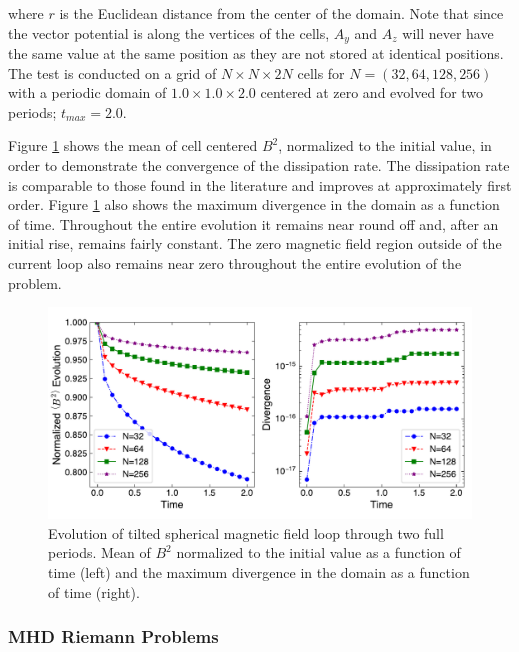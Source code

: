 \documentclass[modern, linenumbers]{aastex631}
\newcommand*{\img}[1]{%
    \raisebox{-.3\baselineskip}{%
        \texttt{[image: \#1]}%
    }%
}
\begin{document}
\noindent where $r$ is the Euclidean distance from the center of the domain. Note that since the vector potential is along the vertices of the cells, $A_y$ and $A_z$ will never have the same value at the same position as they are not stored at identical positions. The test is conducted on a grid of $N\times N\times 2N$ cells for $N=(32, 64, 128, 256)$ with a periodic domain of $1.0\times1.0\times2.0$ centered at zero and evolved for two periods; $t_{max} = 2.0$.

Figure \ref{fig:afl} shows the mean of cell centered $B^2$, normalized to the initial value, in order to demonstrate the convergence of the dissipation rate. The dissipation rate is comparable to those found in the literature \citep{stone_athena_2008} and improves at approximately first order. Figure \ref{fig:afl} also shows the maximum divergence in the domain as a function of time. Throughout the entire evolution it remains near round off and, after an initial rise, remains fairly constant. The zero magnetic field region outside of the current loop also remains near zero throughout the entire evolution of the problem.

\begin{figure}[ht!]
    \includegraphics[width=\linewidth]{afl.pdf}
    \caption{Evolution of tilted spherical magnetic field loop through two full periods. Mean of $B^2$ normalized to the initial value as a function of time (left) and the maximum divergence in the domain as a function of time (right). \href{https://github.com/bcaddy/caddy-et-al-2023/blob/a5d284c28192e6ae8b0c09e82f75a36456cf0ca6/python/advecting-field-loop.py}{\img{github.png}}}
    \label{fig:afl}
\end{figure}

\subsubsection{MHD Riemann Problems}
\label{sec:riemann}
\end{document}
